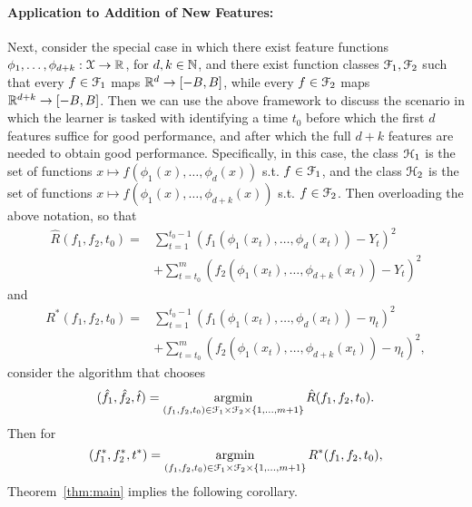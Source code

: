 \documentclass{article}
\begin{document}
\paragraph{Application to Addition of New Features:}
Next, consider the special case in which there exist feature functions $\phi_{1},\ldots,\phi_{d+k} : \mathcal X \to \mathbb{R}$, for $d,k \in \mathbb{N}$,
and there exist function classes $\mathcal{F}_{1},\mathcal{F}_{2}$ such that every $f \in \mathcal{F}_{1}$ maps $\mathbb{R}^{d} \to [-B,B]$,
while every $f \in \mathcal{F}_{2}$ maps $\mathbb{R}^{d+k} \to [-B,B]$.
Then we can use the above framework to discuss the scenario in which the learner is tasked with 
identifying a time $t_{0}$ before which the first $d$ features suffice for good performance, and after which 
the full $d+k$ features are needed to obtain good performance.  Specifically, in this case, the class $\mathcal H_{1}$
is the set of functions $x \mapsto f(\phi_{1}(x),\ldots,\phi_{d}(x))$ s.t. $f \in \mathcal{F}_{1}$, and the class $\mathcal H_{2}$
is the set of functions $x \mapsto f(\phi_{1}(x),\ldots,\phi_{d+k}(x))$ s.t. $f \in \mathcal{F}_{2}$.
Then overloading the above notation, so that
\begin{align*}
\hat{R}(f_{1},f_{2},t_{0}) = &
\sum_{t=1}^{t_{0}-1} ( f_{1}(\phi_{1}(x_{t}),\ldots,\phi_{d}(x_{t})) - Y_{t} )^{2} \\&
+ \sum_{t=t_{0}}^{m} ( f_{2}(\phi_{1}(x_{t}),\ldots,\phi_{d+k}(x_{t})) - Y_{t} )^{2}
\end{align*}
and
\begin{align*}
R^{*}(f_{1},f_{2},t_{0}) = & 
\sum_{t=1}^{t_{0}-1} ( f_{1}(\phi_{1}(x_{t}),\ldots,\phi_{d}(x_{t})) - \eta_{t} )^{2} \\&
 + \sum_{t=t_{0}}^{m} ( f_{2}(\phi_{1}(x_{t}),\ldots,\phi_{d+k}(x_{t})) - \eta_{t} )^{2},
\end{align*}
consider the algorithm that chooses
\begin{equation*}
(\hat{f}_{1},\hat{f}_{2},\hat{t}) = \mathop{\rm argmin}_{(f_{1},f_{2},t_{0}) \in \mathcal{F}_{1} \times \mathcal{F}_{2} \times \{1,\ldots,m+1\}} \hat{R}(f_{1},f_{2},t_{0}).
\end{equation*}
Then for 
\begin{equation*}
(f_{1}^{*},f_{2}^{*},t^{*}) = \mathop{\rm argmin}_{(f_{1},f_{2},t_{0}) \in \mathcal{F}_{1} \times \mathcal{F}_{2} \times \{1,\ldots,m+1\}} R^{*}(f_{1},f_{2},t_{0}),
\end{equation*}
Theorem~\ref{thm:main} implies the following corollary.
\end{document}
